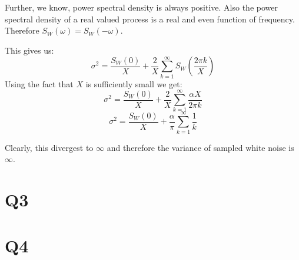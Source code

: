 \documentclass{article}
\begin{document}
Further, we know, power spectral density is always positive. Also the power spectral density of a real valued process is a real and even function of frequency. Therefore $S_W(\omega) = S_W(-\omega)$.

This gives us:
$$\sigma^2 = \frac{S_W(0)}{X} +  \frac{2}{X} \sum_{k=1}^{\infty} S_W(\frac{2 \pi k}{X})$$
Using the fact that $X$ is sufficiently small we get:
$$\sigma^2 = \frac{S_W(0)}{X} +  \frac{2}{X} \sum_{k=1}^{\infty} \frac{\alpha X}{2 \pi k}$$
$$\sigma^2 = \frac{S_W(0)}{X} + \frac{\alpha}{\pi} \sum_{k=1}^{\infty} \frac{1}{k}$$

Clearly, this divergest to $\infty$ and therefore the variance of sampled white noise is $\infty$.

\section*{Q3}

\section*{Q4}
\end{document}
